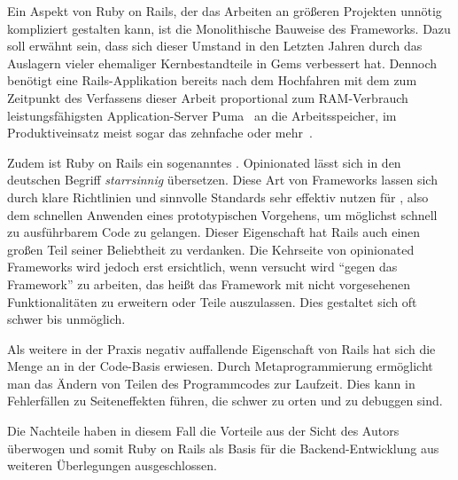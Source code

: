 Ein Aspekt von Ruby on Rails, der das Arbeiten an größeren Projekten unnötig
kompliziert gestalten kann, ist die Monolithische Bauweise des Frameworks.  Dazu
soll erwähnt sein, dass sich dieser Umstand in den Letzten Jahren durch das
Auslagern vieler ehemaliger Kernbestandteile in Gems verbessert hat.  Dennoch
benötigt eine Rails-Applikation bereits nach dem Hochfahren mit dem zum
Zeitpunkt des Verfassens dieser Arbeit proportional zum RAM-Verbrauch
leistungsfähigsten Application-Server Puma~\cite{puma} an die 
Arbeitsspeicher, im Produktiveinsatz meist sogar das zehnfache oder
mehr~\cite{railsappservercomparison}.

Zudem ist Ruby on Rails ein sogenanntes .
Opinionated lässt sich in den deutschen Begriff \emph{starrsinnig} übersetzen.
Diese Art von Frameworks lassen sich durch klare Richtlinien und sinnvolle
Standards sehr effektiv nutzen für ,
also dem schnellen Anwenden eines prototypischen Vorgehens, um möglichst schnell
zu ausführbarem Code zu gelangen.  Dieser Eigenschaft hat Rails auch einen
großen Teil seiner Beliebtheit zu verdanken.  Die Kehrseite von opinionated
Frameworks wird jedoch erst ersichtlich, wenn versucht wird \enquote{gegen das
Framework} zu arbeiten, das heißt das Framework mit nicht vorgesehenen
Funktionalitäten zu erweitern oder Teile auszulassen.  Dies gestaltet sich oft
schwer bis unmöglich.

Als weitere in der Praxis negativ auffallende Eigenschaft von Rails hat
sich die Menge an  in der Code-Basis erwiesen.
Durch Metaprogrammierung ermöglicht man das Ändern von Teilen des Programmcodes
zur Laufzeit. Dies kann in Fehlerfällen zu Seiteneffekten führen, die schwer zu
orten und zu debuggen sind.

Die Nachteile haben in diesem Fall die Vorteile aus der Sicht des Autors
überwogen und somit Ruby on Rails als Basis für die Backend-Entwicklung aus
weiteren Überlegungen ausgeschlossen.

